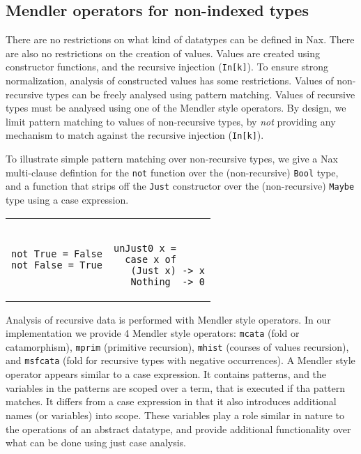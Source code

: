 \subsection{Mendler operators for non-indexed types}
There are no restrictions on what kind of datatypes
can be defined in Nax. There are also no restrictions on the creation
of values. Values are created using constructor functions, and the recursive injection (\verb+In[k]+). 
To ensure strong normalization, analysis of constructed
values has some restrictions. Values of non-recursive types can
be freely analysed using pattern matching. Values of recursive types
must be analysed using one of the Mendler style operators. By design,
we limit pattern matching to values of non-recursive types, by
{\em not} providing any mechanism to match against
the recursive injection (\verb+In[k]+).

To illustrate simple pattern matching over non-recursive types, we 
give a Nax multi-clause defintion for the \verb+not+ function over the (non-recursive) \verb+Bool+ type,
and a function that strips off the \verb+Just+ constructor over the (non-recursive) \verb+Maybe+ type
using a case expression.

\begin{tabular}{l|l}
\begin{minipage}[l]{.42\linewidth}
{\small
\begin{verbatim}
not True = False
not False = True
\end{verbatim}}
\end{minipage}

& 

\begin{minipage}[l]{.50\linewidth}
{\small
\begin{verbatim}

unJust0 x = 
  case x of
   (Just x) -> x
   Nothing  -> 0
\end{verbatim}}
\end{minipage}
\end{tabular}
\vspace*{.1in}

Analysis of recursive data is performed with Mendler style operators. In our
implementation we provide 4 Mendler style operators: \verb+mcata+ (fold or catamorphism),
\verb+mprim+ (primitive recursion), \verb+mhist+ (courses of values recursion), and
\verb+msfcata+ (fold for recursive types with negative occurrences). A Mendler style
operator appears similar to a case expression. It contains patterns, and the variables in
the patterns are scoped over a term, that is executed if tha pattern matches. It differs
from a case expression in that it also introduces additional names (or variables) into
scope. These variables play a role similar in nature to the operations of an abstract
datatype, and provide additional functionality over what can be done using just
case analysis.

